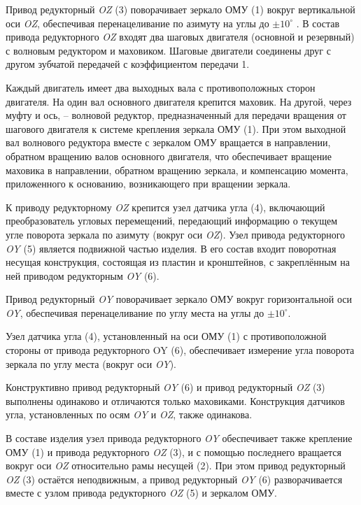 Привод редукторный \textit{OZ} (3) поворачивает зеркало ОМУ (1) вокруг вертикальной оси \textit{OZ}, обеспечивая перенацеливание по азимуту на углы до $\pm10^{\circ}$ . 
В состав привода редукторного \textit{OZ} входят два шаговых двигателя (основной и резервный) с волновым редуктором и маховиком.
Шаговые двигатели соединены друг с другом зубчатой передачей с коэффициентом передачи 1.

Каждый двигатель имеет два выходных вала с противоположных сторон двигателя. На один вал основного двигателя крепится маховик. На другой, через муфту и ось, – волновой редуктор, предназначенный для передачи вращения от шагового двигателя к системе крепления зеркала ОМУ (1). При этом выходной вал волнового редуктора вместе с зеркалом ОМУ вращается в направлении, обратном вращению валов основного двигателя, что обеспечивает вращение маховика в направлении, обратном вращению зеркала, и компенсацию момента, приложенного к основанию, возникающего при вращении зеркала.

К приводу редукторному \textit{OZ} крепится узел датчика угла (4), включающий преобразователь угловых перемещений, передающий информацию о текущем угле поворота зеркала по азимуту (вокруг оси \emph{OZ}).
Узел привода редукторного \emph{OY} (5) является подвижной частью изделия. В его состав входит поворотная несущая конструкция, состоящая из пластин и кронштейнов, с закреплённым на ней приводом редукторным \emph{OY} (6). 

Привод редукторный \emph{OY} поворачивает зеркало ОМУ вокруг горизонтальной оси \emph{OY}, обеспечивая перенацеливание по углу места на углы до $\pm10^{\circ}$. 

Узел датчика угла (4), установленный на оси ОМУ (1) с противоположной стороны от привода редукторного OY (6), обеспечивает измерение угла поворота зеркала по углу места (вокруг оси \emph{OY}).

Конструктивно привод редукторный \emph{OY} (6) и привод редукторный \emph{OZ} (3) выполнены одинаково и отличаются только маховиками. Конструкция датчиков угла, установленных по осям \emph{OY} и \emph{OZ}, также одинакова.

В составе изделия узел привода редукторного \emph{OY} обеспечивает также крепление ОМУ (1) и привода редукторного \emph{OZ} (3), и с помощью последнего вращается вокруг оси \emph{OZ} относительно рамы несущей (2). При этом привод редукторный \emph{OZ} (3) остаётся неподвижным, а привод редукторный \emph{OY} (6) разворачивается вместе с узлом привода редукторного \emph{OZ} (5) и зеркалом ОМУ. 

